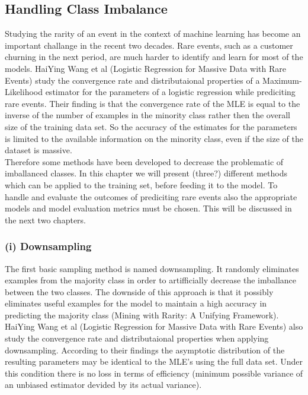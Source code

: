 \documentclass[12pt,titlepage]{article}
\begin{document}
\subsection{Handling Class Imbalance} \par

Studying the rarity of an event in the context of machine learning has become an important challange in the recent two decades. Rare events, such as a customer churning in the
next period, are much harder to identify and learn for most of the models. HaiYing Wang et al (Logistic Regression for Massive Data with Rare Events) study the convergence rate
and distributaional properties of a Maximum-Likelihood estimator for the parameters of a logistic regression while prediciting rare events. Their finding is that the convergence
rate of the MLE is equal to the inverse of the number of examples in the minority class rather then the overall size of the training data set. So the accuracy of the estimates for
the parameters is limited to the available information on the minority class, even if the size of the dataset is massive. \\
Therefore some methods have been developed to decrease the problematic of imballanced classes. In
this chapter we will present (three?) different methods which can be applied to the training set, before feeding it to the model. To handle and evaluate the outcomes
of prediciting rare events also the appropriate models and model evaluation metrics must be chosen. This will be discussed in the next two chapters. \\

\subsubsection*{(i) Downsampling}

The first basic sampling method is named downsampling. It randomly eliminates examples from the majority class in order to artifficially decrease the imballance between the
two classes. The downside of this approach is that it possibly eliminates useful examples for the model to maintain a high accuracy in predicting the majority class 
(Mining with Rarity: A Unifying Framework). HaiYing Wang et al (Logistic Regression for Massive Data with Rare Events) also study the convergence rate and distributaional
properties when applying downsampling. According to their findings the asymptotic distribution of the resulting parameters may be identical to the MLE's using the full data set.
Under this condition there is no loss in terms of efficiency (minimum possible variance of an unbiased estimator devided by its actual variance). \\
\end{document}
